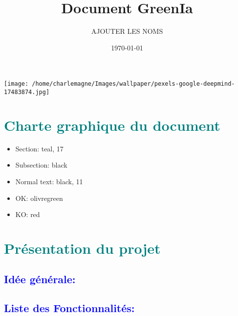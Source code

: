 \documentclass[11pt]{article}
\title{Document GreenIa}
\author{AJOUTER LES NOMS}
\date{\today}
\begin{document}
\maketitle

\begin{center}
    \texttt{[image: /home/charlemagne/Images/wallpaper/pexels-google-deepmind-17483874.jpg]}
\end{center}

\section{\textcolor{teal}{Charte graphique du document}} 
\begin{itemize}
\item Section: teal, 17
\item Subsection: black 
\item Normal text: black, 11 
\item OK: olivregreen
\item KO: red 
\end{itemize}

\section{\textcolor{teal}{Présentation du projet\\}}
\subsection*{\textcolor{blue}{Idée générale:}}
\subsection*{\textcolor{blue}{Liste des Fonctionnalités:}}
\end{document}
